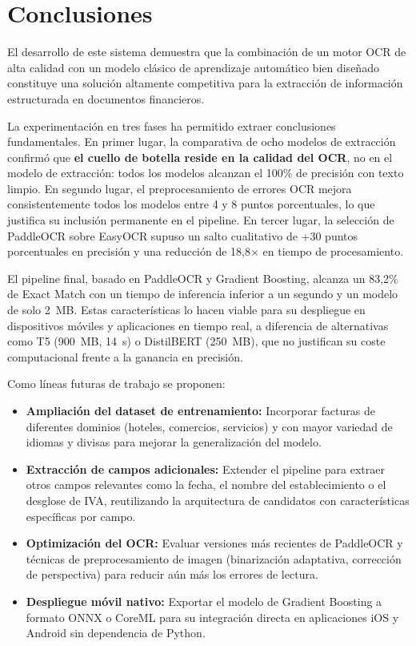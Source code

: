 \section{Conclusiones}
\label{sec:conclusiones}

El desarrollo de este sistema demuestra que la combinación de un motor OCR de alta calidad con un modelo clásico de aprendizaje automático bien diseñado constituye una solución altamente competitiva para la extracción de información estructurada en documentos financieros.

La experimentación en tres fases ha permitido extraer conclusiones fundamentales. En primer lugar, la comparativa de ocho modelos de extracción confirmó que \textbf{el cuello de botella reside en la calidad del OCR}, no en el modelo de extracción: todos los modelos alcanzan el 100\% de precisión con texto limpio. En segundo lugar, el preprocesamiento de errores OCR mejora consistentemente todos los modelos entre 4 y 8 puntos porcentuales, lo que justifica su inclusión permanente en el pipeline. En tercer lugar, la selección de PaddleOCR sobre EasyOCR supuso un salto cualitativo de +30 puntos porcentuales en precisión y una reducción de 18,8$\times$ en tiempo de procesamiento.

El pipeline final, basado en PaddleOCR y Gradient Boosting, alcanza un 83,2\% de Exact Match con un tiempo de inferencia inferior a un segundo y un modelo de solo 2~MB. Estas características lo hacen viable para su despliegue en dispositivos móviles y aplicaciones en tiempo real, a diferencia de alternativas como T5 (900~MB, 14~s) o DistilBERT (250~MB), que no justifican su coste computacional frente a la ganancia en precisión.

Como líneas futuras de trabajo se proponen:

\begin{itemize}
    \item \textbf{Ampliación del dataset de entrenamiento:} Incorporar facturas de diferentes dominios (hoteles, comercios, servicios) y con mayor variedad de idiomas y divisas para mejorar la generalización del modelo.
    \item \textbf{Extracción de campos adicionales:} Extender el pipeline para extraer otros campos relevantes como la fecha, el nombre del establecimiento o el desglose de IVA, reutilizando la arquitectura de candidatos con características específicas por campo.
    \item \textbf{Optimización del OCR:} Evaluar versiones más recientes de PaddleOCR y técnicas de preprocesamiento de imagen (binarización adaptativa, corrección de perspectiva) para reducir aún más los errores de lectura.
    \item \textbf{Despliegue móvil nativo:} Exportar el modelo de Gradient Boosting a formato ONNX o CoreML para su integración directa en aplicaciones iOS y Android sin dependencia de Python.
\end{itemize}
